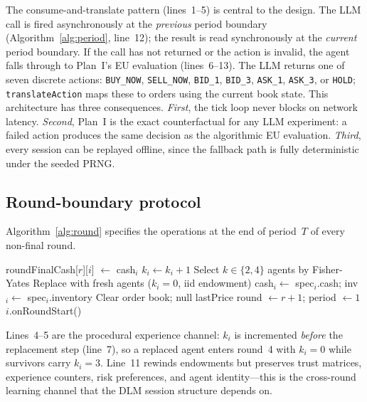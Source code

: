 The consume-and-translate pattern (lines~1--5) is central to the
design.  The LLM call is fired asynchronously at the \emph{previous}
period boundary (Algorithm~\ref{alg:period}, line~12); the result is
read synchronously at the \emph{current} period boundary.  If the
call has not returned or the action is invalid, the agent falls
through to Plan~I's EU evaluation (lines~6--13).  The LLM returns
one of seven discrete actions: \texttt{BUY\_NOW}, \texttt{SELL\_NOW},
\texttt{BID\_1}, \texttt{BID\_3}, \texttt{ASK\_1}, \texttt{ASK\_3},
or \texttt{HOLD}; \texttt{translateAction} maps these to orders
using the current book state.  This architecture has three
consequences.
\emph{First}, the tick loop never blocks on network latency.
\emph{Second}, Plan~I is the exact counterfactual for any LLM
experiment: a failed action produces the same decision as the
algorithmic EU evaluation.
\emph{Third}, every session can be replayed offline, since the
fallback path is fully deterministic under the seeded PRNG.

\subsection{Round-boundary protocol}

Algorithm~\ref{alg:round} specifies the operations at the end of
period~$T$ of every non-final round.

\begin{algorithm}[h]
\caption{Round-boundary protocol (end of period $T$, round $r < R$)}
\label{alg:round}
\begin{algorithmic}[1]
  \State roundFinalCash[$r$][$i$] $\gets$ cash$_i$
\EndFor
{}
  \State $k_i \gets k_i + 1$
\EndFor
{}
  \State Select $k \in \{2,4\}$ agents by Fisher-Yates
  \State Replace with fresh agents ($k_i{=}0$, iid endowment)
\EndIf
{}
  \State cash$_i \gets$ spec$_i$.cash;\;
    inv$_i \gets$ spec$_i$.inventory
\EndFor
\State Clear order book; null lastPrice
\State round $\gets r{+}1$;\; period $\gets 1$
  \State $i$.onRoundStart()
\EndFor
\end{algorithmic}
\end{algorithm}

Lines~4--5 are the procedural experience channel: $k_i$ is
incremented \emph{before} the replacement step (line~7), so a
replaced agent enters round~4 with $k_i{=}0$ while survivors carry
$k_i{=}3$.  Line~11 rewinds endowments but preserves trust matrices,
experience counters, risk preferences, and agent identity---this
is the cross-round learning channel that the DLM session structure
depends on.

